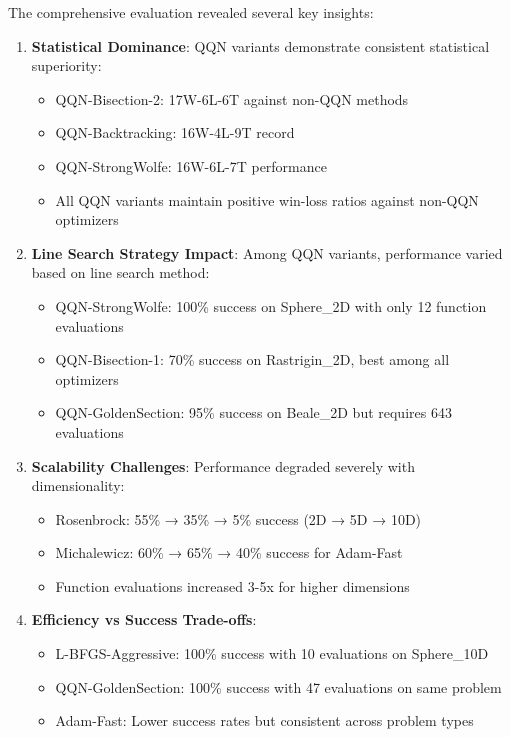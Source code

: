 The comprehensive evaluation revealed several key insights:

\begin{enumerate}
\def\labelenumi{\arabic{enumi}.}
\tightlist
\item
  \textbf{Statistical Dominance}: QQN variants demonstrate consistent statistical superiority:

  \begin{itemize}
  \tightlist
  \item
    QQN-Bisection-2: 17W-6L-6T against non-QQN methods
  \item
    QQN-Backtracking: 16W-4L-9T record
  \item
    QQN-StrongWolfe: 16W-6L-7T performance
  \item
    All QQN variants maintain positive win-loss ratios against non-QQN optimizers
  \end{itemize}
\item
  \textbf{Line Search Strategy Impact}: Among QQN variants, performance varied based on line search method:

  \begin{itemize}
  \tightlist
  \item
    QQN-StrongWolfe: 100\% success on Sphere\_2D with only 12 function evaluations
  \item
    QQN-Bisection-1: 70\% success on Rastrigin\_2D, best among all optimizers
  \item
    QQN-GoldenSection: 95\% success on Beale\_2D but requires 643 evaluations
  \end{itemize}
\item
  \textbf{Scalability Challenges}: Performance degraded severely with dimensionality:

  \begin{itemize}
  \tightlist
  \item
    Rosenbrock: 55\% → 35\% → 5\% success (2D → 5D → 10D)
  \item
    Michalewicz: 60\% → 65\% → 40\% success for Adam-Fast
  \item
    Function evaluations increased 3-5x for higher dimensions
  \end{itemize}
\item
  \textbf{Efficiency vs Success Trade-offs}:

  \begin{itemize}
  \tightlist
  \item
    L-BFGS-Aggressive: 100\% success with 10 evaluations on Sphere\_10D
  \item
    QQN-GoldenSection: 100\% success with 47 evaluations on same problem
  \item
    Adam-Fast: Lower success rates but consistent across problem types
  \end{itemize}
\end{enumerate}


